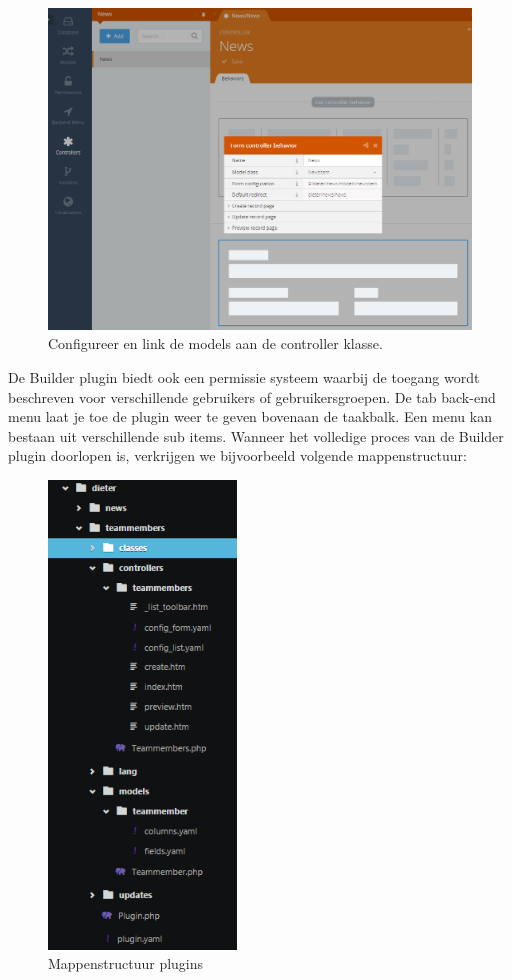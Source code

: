 \begin{figure}[!ht]
  \includegraphics[width=140mm]{img/oc-builder-controller.png}
  \centering
  \caption{Configureer en link de models aan de controller klasse. }
  \label{fig:Builder plugin, controller aanmaken}
\end{figure}

\pagebreak
\noindent
De Builder plugin biedt ook een permissie systeem waarbij de toegang wordt beschreven voor verschillende gebruikers of gebruikersgroepen. De tab back-end menu laat je toe de plugin weer te geven bovenaan de taakbalk. Een menu kan bestaan uit verschillende sub items.
\clearpage
\noindent
Wanneer het volledige proces van de Builder plugin doorlopen is, verkrijgen we bijvoorbeeld volgende mappenstructuur: 

\begin{figure}[!ht]
  \includegraphics[width=50mm]{img/oc-plugin-folders.png}
  \centering
  \caption{Mappenstructuur plugins}
  \label{fig:Mappenstructuur plugins}
\end{figure}


